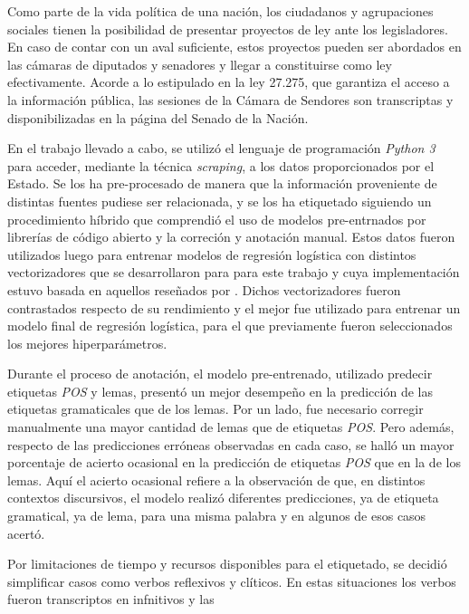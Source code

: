 Como parte de la vida pol\'itica de una naci\'on, los ciudadanos y
agrupaciones sociales tienen la posibilidad de presentar proyectos
de ley ante los legisladores. En caso de contar con un aval suficiente,
estos proyectos pueden ser abordados en las c\'amaras de diputados
y senadores y llegar a constituirse como ley efectivamente.
Acorde a lo estipulado en la ley 27.275, que garantiza el acceso a la
informaci\'on p\'ublica, las sesiones de la C\'amara de Sendores son
transcriptas y disponibilizadas en la p\'agina del Senado de la Naci\'on.
\par
En el trabajo llevado a cabo, se utiliz\'o el lenguaje de
programaci\'on \textit{Python 3} para acceder, mediante la t\'ecnica
\textit{scraping}, a los datos proporcionados por el Estado. Se los ha
pre-procesado de manera que la informaci\'on proveniente de
distintas fuentes pudiese ser relacionada, y se los ha etiquetado
siguiendo un procedimiento h\'ibrido que comprendi\'o el uso de modelos
pre-entrnados por librer\'ias de c\'odigo abierto y la correci\'on y
anotaci\'on manual. Estos datos fueron utilizados luego para entrenar modelos
de regresi\'on log\'istica con distintos vectorizadores que se desarrollaron
para para este trabajo y cuya implementaci\'on estuvo basada en aquellos
reseñados por \cite{monroe2008fightin}. Dichos vectorizadores fueron
contrastados respecto de su rendimiento y el mejor fue utilizado para entrenar
un modelo final de regresi\'on log\'istica, para el que previamente fueron
seleccionados los mejores hiperpar\'ametros.
\par
Durante el proceso de anotaci\'on, el modelo pre-entrenado, utilizado
predecir etiquetas \textit{POS} y lemas, present\'o un mejor desempeño en la
predicci\'on de las etiquetas gramaticales que de los lemas.
Por un lado, fue necesario corregir manualmente una mayor cantidad de lemas
que de etiquetas \textit{POS}. Pero adem\'as, respecto de las predicciones
err\'oneas observadas en cada caso, se hall\'o un mayor porcentaje de acierto
ocasional en la predicci\'on de etiquetas \textit{POS} que en la de los lemas.
Aqu\'i el acierto ocasional refiere a la observaci\'on de que, en distintos contextos
discursivos, el modelo realiz\'o diferentes predicciones, ya de etiqueta gramatical, ya
de lema, para una misma palabra y en algunos de esos casos acertó.
\par
Por limitaciones de tiempo y recursos disponibles para el etiquetado,
se decidi\'o simplificar casos como verbos reflexivos y cl\'iticos. En
estas situaciones los verbos fueron transcriptos en infnitivos y las

